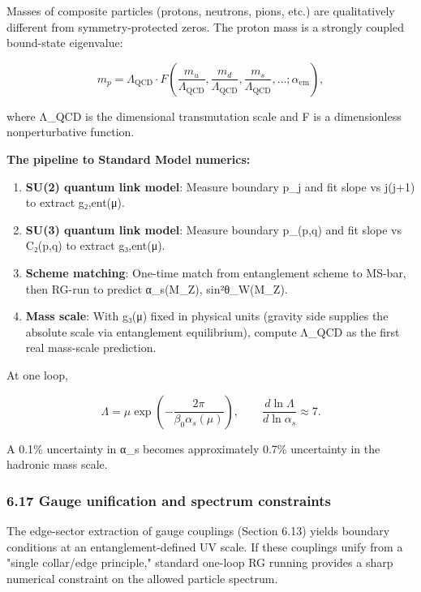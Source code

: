 Masses of composite particles (protons, neutrons, pions, etc.) are qualitatively different from symmetry-protected zeros. The proton mass is a strongly coupled bound-state eigenvalue:

\[
m_p = \Lambda_{\mathrm{QCD}} \cdot F\left(\frac{m_u}{\Lambda_{\mathrm{QCD}}},
\frac{m_d}{\Lambda_{\mathrm{QCD}}}, \frac{m_s}{\Lambda_{\mathrm{QCD}}}, \ldots;
\alpha_{\mathrm{em}}\right),
\]

where Λ\_QCD is the dimensional transmutation scale and F is a dimensionless nonperturbative function.

\textbf{The pipeline to Standard Model numerics:}

\begin{enumerate}
\def\labelenumi{\arabic{enumi}.}
\item
  \textbf{SU(2) quantum link model}: Measure boundary p\_j and fit slope vs j(j+1) to extract g₂,ent(μ).
\item
  \textbf{SU(3) quantum link model}: Measure boundary p\_(p,q) and fit slope vs C₂(p,q) to extract g₃,ent(μ).
\item
  \textbf{Scheme matching}: One-time match from entanglement scheme to MS-bar, then RG-run to predict α\_s(M\_Z), sin²θ\_W(M\_Z).
\item
  \textbf{Mass scale}: With g₃(μ) fixed in physical units (gravity side supplies the absolute scale via entanglement equilibrium), compute Λ\_QCD as the first real mass-scale prediction.
\end{enumerate}

At one loop,

\[
\Lambda = \mu \exp\left(-\frac{2\pi}{\beta_0 \alpha_s(\mu)}\right),
\qquad
\frac{d \ln \Lambda}{d \ln \alpha_s} \approx 7.
\]

A 0.1\% uncertainty in α\_s becomes approximately 0.7\% uncertainty in the hadronic mass scale.

\subsubsection{6.17 Gauge unification and spectrum constraints}\label{617-gauge-unification-and-spectrum-constraints}

The edge-sector extraction of gauge couplings (Section 6.13) yields boundary conditions at an entanglement-defined UV scale. If these couplings unify from a "single collar/edge principle," standard one-loop RG running provides a sharp numerical constraint on the allowed particle spectrum.

